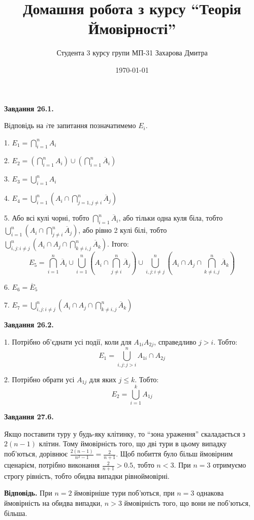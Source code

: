 \documentclass[12pt]{extarticle}
\title{Домашня робота з курсу ``Теорія Ймовірності''}
\author{Студента 3 курсу групи МП-31 Захарова Дмитра}
\date{\today}
\begin{document}
\maketitle

\textbf{Завдання 26.1.} 

Відповідь на $i$те запитання позначатимемо $E_i$.

1. $E_1 = \bigcap_{i=1}^n A_i$ 

2. $E_2 = \left(\bigcap_{i=1}^n A_i\right) \cup \left(\bigcap_{i=1}^n \overline{A}_i\right)$

3. $E_3 = \bigcup_{i=1}^n A_i$

4. $E_4 = \bigcup_{i=1}^n\left(A_i \cap \bigcap_{j=1,j\neq i}^n \overline{A}_j\right)$

5. Або всі кулі чорні, тобто $\bigcap_{i=1}^n \overline{A}_i$, або тільки одна куля біла, тобто $\bigcup_{i=1}^n\left(A_i \cap \bigcap_{j\neq i}^n \overline{A}_j\right)$, або рівно 2 кулі білі, тобто $\bigcup_{i,j: i \neq j}^n \left(A_i \cap A_j \cap \bigcap_{k \neq i,j}^n \overline{A}_k\right)$. Ітого:
\[
E_5 = \bigcap_{i=1}^n \overline{A}_i \cup \bigcup_{i=1}^n\left(A_i \cap \bigcap_{j\neq i}^n \overline{A}_j\right) \cup \bigcup_{i,j: i \neq j}^n \left(A_i \cap A_j \cap \bigcap_{k \neq i,j}^n \overline{A}_k\right)
\]

6. $E_6 = \overline{E}_5$

7. $E_7 = \bigcup_{i,j: i \neq j}^n \left(A_i \cap A_j \cap \bigcap_{k \neq i,j}^n \overline{A}_k\right)$

\textbf{Завдання 26.2.} 

1. Потрібно об'єднати усі події, коли для $A_{1i} A_{2j}$, справедливо $j>i$. Тобто:
\[
E_1 = \bigcup_{i,j:j > i}^n A_{1i} \cap A_{2j} 
\]

2. Потрібно обрати усі $A_{1j}$ для яких $j \leq k$. Тобто:
\[
E_2 = \bigcup_{i=1}^k A_{1j} 
\]

\textbf{Завдання 27.6.}


Якщо поставити туру у будь-яку клітинку, то ``зона ураження'' скаладається з $2(n-1)$ клітин. Тому ймовірність того, що дві тури в цьому випадку поб'ються, дорівнює $\frac{2(n-1)}{n^2 - 1} = \frac{2}{n+1}$. Щоб побиття було більш ймовірним сценарієм, потрібно виконання $\frac{2}{n+1} > 0.5$, тобто $n<3$. При $n=3$ отримуємо строгу рівність, тобто обидва випадки рівноймовірні. 

\textbf{Відповідь.} При $n = 2$ ймовірніше тури поб'ються, при $n=3$ однакова ймовірність на обидва випадки, $n>3$ ймовірність того, що вони не поб'ються, більша. 
\end{document}

